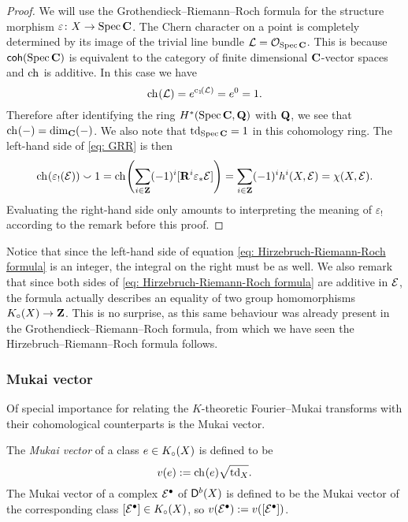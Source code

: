 \begin{proof}
    We will use the Grothendieck--Riemann--Roch formula for the structure morphism $\varepsilon \colon X \to \operatorname{Spec}\mathbf C$. The Chern character on a point is completely determined by its image of the trivial line bundle $\mathcal L = {\mathcal{O}_{\operatorname{Spec}\mathbf C}}$. This is because $\mathsf{coh}(\operatorname{Spec}\mathbf C)$ is equivalent to the category of finite dimensional $\mathbf C$-vector spaces and $\ch[]$ is additive. In this case we have
    \[
        \ch[]{\mathcal L} = e^{\cclass[1]{\mathcal L}} = e^0 = 1.
    \]
    Therefore after identifying the ring $H^{*}(\operatorname{Spec}\mathbf C, \mathbf Q)$ with $\mathbf Q$, we see that $\ch[](-) = \dim_\C(-)$. We also note that $\operatorname{td}_{\operatorname{Spec}\mathbf C} = 1$ in this cohomology ring. The left-hand side of \eqref{eq: GRR} is then
    \[
        \ch[]{\varepsilon_!(\E)}\smallsmile 1 = \ch[]{\sum_{i \in \Z}(-1)^i[\rderived{i}{\varepsilon_*}\E]} = \sum_{i\in \Z}(-1)^i h^i({X},{\E}) = \chi(X, \E).
    \]  
    Evaluating the right-hand side only amounts to interpreting the meaning of $\varepsilon_!$ according to the remark before this proof.
\end{proof}

\begin{remark}
    \label{HRR is an equality of homomorphisms}
    Notice that since the left-hand side of equation \eqref{eq: Hirzebruch-Riemann-Roch formula} is an integer, the integral on the right must be as well. 
    We also remark that since both sides of \eqref{eq: Hirzebruch-Riemann-Roch formula} are additive in $\mathcal E$, the formula actually describes an equality of two group homomorphisms $K_{\circ}(X) \to \mathbf Z$. This is no surprise, as this same behaviour was already present in the Grothendieck--Riemann--Roch formula, from which we have seen the Hirzebruch--Riemann--Roch formula follows.
\end{remark}

\subsubsection*{Mukai vector}

Of special importance for relating the $K$-theoretic Fourier--Mukai transforms with their cohomological counterparts is the Mukai vector. 

\begin{definition}
    The \emph{Mukai vector} of a class $e \in K_{\circ}(X)$ is defined to be
    \[
        v(e) := \ch[](e)\sqrt{\tdclass{X}}.
    \]
    The Mukai vector of a complex $\mathcal E^\bullet$ of $\mathsf{D}^b(X)$ is defined to be the Mukai vector of the corresponding class $[\mathcal E^\bullet] \in K_{\circ}(X)$, so $v(\mathcal E^\bullet) := v([\mathcal E^\bullet])$.
\end{definition}

